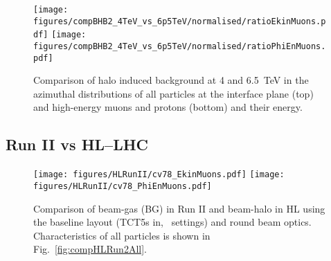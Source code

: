 \begin{figure}
\centering
  \texttt{[image: figures/compBHB2\_4TeV\_vs\_6p5TeV/normalised/ratioEkinMuons.pdf]}
  \texttt{[image: figures/compBHB2\_4TeV\_vs\_6p5TeV/normalised/ratioPhiEnMuons.pdf]}
 \caption{Comparison of halo induced background at 4 and 6.5~TeV in the azimuthal distributions of all particles at the interface plane (top) and high-energy muons and protons (bottom) and their energy.
  \label{compBHB1run1run2}}
\end{figure}




\subsection{Run II vs HL--LHC}

\begin{figure}
\begin{center}
  \texttt{[image: figures/HLRunII/cv78\_EkinMuons.pdf]}
  \texttt{[image: figures/HLRunII/cv78\_PhiEnMuons.pdf]}
\end{center}
\vspace{-0.6cm}
 \caption{Comparison of beam-gas (BG) in Run II and beam-halo in HL using the baseline layout (TCT5s in, \twosigmaret~settings) and round beam optics. Characteristics of all particles is shown in Fig.~\ref{fig:compHLRun2All}.
  \label{fig:hlrun2}}
\end{figure}
